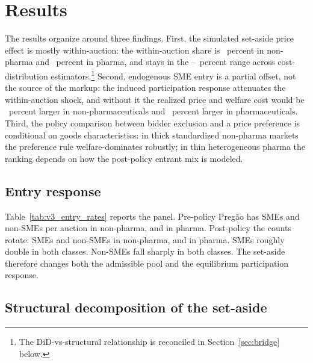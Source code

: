 \section{Results}\label{sec:results}

The results organize around three findings. First, the simulated set-aside price effect is mostly within-auction: the within-auction share is \bneShareIntensNp~percent in non-pharma and \bneShareIntensPh~percent in pharma, and stays in the \withinShareLow--\withinShareHigh~percent range across cost-distribution estimators.\footnote{The DiD-vs-structural relationship is reconciled in Section~\ref{sec:bridge} below.} Second, endogenous SME entry is a partial offset, not the source of the markup: the induced participation response attenuates the within-auction shock, and without it the realized price and welfare cost would be \latentShockRatioNp~percent larger in non-pharmaceuticals and \latentShockRatioPh~percent larger in pharmaceuticals. Third, the policy comparison between bidder exclusion and a \optPrefThreshold{} price preference is conditional on goods characteristics: in thick standardized non-pharma markets the preference rule welfare-dominates robustly; in thin heterogeneous pharma the ranking depends on how the post-policy entrant mix is modeled.

\subsection{Entry response}

Table~\ref{tab:v3_entry_rates} reports the panel. Pre-policy Preg\~ao has \bneNsmePreNp{} SMEs and \bneNnsPreNp{} non-SMEs per auction in non-pharma, \bneNsmePrePh{} and \bneNnsPrePh{} in pharma. Post-policy the counts rotate: \bneNsmePostNp{} SMEs and \nonSmePostNp{} non-SMEs in non-pharma, \bneNsmePostPh{} and \nonSmePostPh{} in pharma. SMEs roughly double in both classes. Non-SMEs fall sharply in both classes. The set-aside therefore changes both the admissible pool and the equilibrium participation response.

\subsection{Structural decomposition of the set-aside}

